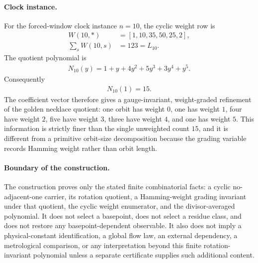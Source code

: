 \paragraph{Clock instance.}
For the forced-window clock instance $n=10$, the cyclic weight row is
$$
\begin{aligned}
 W(10,*)&=[1,10,35,50,25,2],\\
 \sum_s W(10,s)&=123=L_{10}.
\end{aligned}
$$
The quotient polynomial is
$$
\begin{aligned}
 N_{10}(y)=1+y+4y^2+5y^3+3y^4+y^5.
\end{aligned}
$$
Consequently
$$
\begin{aligned}
 N_{10}(1)=15.
\end{aligned}
$$
The coefficient vector therefore gives a gauge-invariant, weight-graded refinement of the golden necklace quotient: one orbit has weight $0$, one has weight $1$, four have weight $2$, five have weight $3$, three have weight $4$, and one has weight $5$.  This information is strictly finer than the single unweighted count $15$, and it is different from a primitive orbit-size decomposition because the grading variable records Hamming weight rather than orbit length.

\paragraph{Boundary of the construction.}
The construction proves only the stated finite combinatorial facts: a cyclic no-adjacent-one carrier, its rotation quotient, a Hamming-weight grading invariant under that quotient, the cyclic weight enumerator, and the divisor-averaged polynomial.  It does not select a basepoint, does not select a residue class, and does not restore any basepoint-dependent observable.  It also does not imply a physical-constant identification, a global flow law, an external dependency, a metrological comparison, or any interpretation beyond this finite rotation-invariant polynomial unless a separate certificate supplies such additional content.
